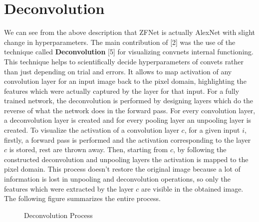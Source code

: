 \documentclass{article} %
\begin{document}
	\section{Deconvolution}
	We can see from the above description that ZFNet is actually AlexNet with slight change in hyperparameters. The main contribution of [2] was the use of the technique called \textbf{Deconvolution} [5]	 for visualizing convnets internal functioning. This technique helps to scientifically decide hyperparameters of convets rather than just depending on trial and errors. It allows to map activation of any convolution layer for an input image back to the pixel domain, highlighting the features which were actually captured by the layer for that input. For a fully trained network, the deconvolution is performed by designing layers which do the reverse of what the network does in the forward pass. For every convolution layer, a deconvolution layer is created and for every pooling layer an unpooling layer is created. To visualize the activation of a convolution layer $c$, for a given input $i$, firstly, a forward pass is performed and the activation corresponding to the layer $c$ is stored, rest are thrown away. Then, starting from $c$, by following the constructed deconvolution and unpooling layers the activation is mapped to the pixel domain. This process doesn't restore the original image because a lot of information is lost in unpooling and deconvolution operations, so only the features which were extracted by the layer $c$ are visible in the obtained image. The following figure summarizes the entire process.
	
	\begin{figure}[h]
		\centering
		\caption{Deconvolution Process}
		\label{deconv}
	\end{figure}
	
\end{document}
